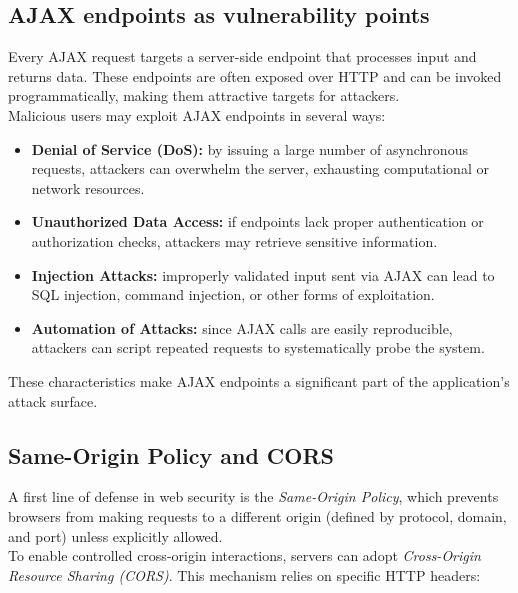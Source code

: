 \documentclass{scrbook}
\begin{document}
	\subsection{AJAX endpoints as vulnerability points}
	
	Every AJAX request targets a server-side endpoint that processes input and returns data. These endpoints are often exposed over HTTP and can be invoked programmatically, making them attractive targets for attackers.\\
	
	Malicious users may exploit AJAX endpoints in several ways:
	
	\begin{itemize}
		\item \textbf{Denial of Service (DoS):} by issuing a large number of asynchronous requests, attackers can overwhelm the server, exhausting computational or network resources.
		
		\item \textbf{Unauthorized Data Access:} if endpoints lack proper authentication or authorization checks, attackers may retrieve sensitive information.
		
		\item \textbf{Injection Attacks:} improperly validated input sent via AJAX can lead to SQL injection, command injection, or other forms of exploitation.
		
		\item \textbf{Automation of Attacks:} since AJAX calls are easily reproducible, attackers can script repeated requests to systematically probe the system.
	\end{itemize}
	
	These characteristics make AJAX endpoints a significant part of the application's attack surface.
	
	\subsection{Same-Origin Policy and CORS}
	
	A first line of defense in web security is the \textit{Same-Origin Policy}, which prevents browsers from making requests to a different origin (defined by protocol, domain, and port) unless explicitly allowed.\\
	
	To enable controlled cross-origin interactions, servers can adopt \textit{Cross-Origin Resource Sharing (CORS)}. This mechanism relies on specific HTTP headers:
	
\end{document}
